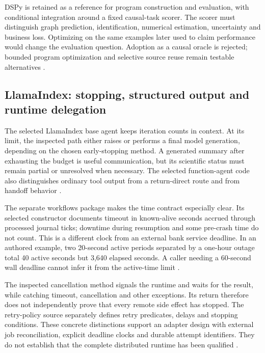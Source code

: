 DSPy is retained as a reference for program construction and evaluation,
with conditional integration around a fixed causal-task scorer. The
scorer must distinguish graph prediction, identification, numerical
estimation, uncertainty and business loss. Optimizing on the same examples
later used to claim performance would change the evaluation question.
Adoption as a causal oracle is rejected; bounded program optimization and
selective source reuse remain testable alternatives
\citep{exec24_framework_contracts}.

\subsection{LlamaIndex: stopping, structured output and runtime delegation}
The selected LlamaIndex base agent keeps iteration counts in context.
At its limit, the inspected path either raises or performs a final model
generation, depending on the chosen early-stopping method. A generated
summary after exhausting the budget is useful communication, but its
scientific status must remain partial or unresolved when necessary.
The selected function-agent code also distinguishes ordinary tool output
from a return-direct route and from handoff behavior
\citep{exec24_framework_llama_index}.

The separate workflows package makes the time contract especially clear.
Its selected constructor documents timeout in known-alive seconds accrued
through processed journal ticks; downtime during resumption and some
pre-crash time do not count. This is a different clock from an external
bank service deadline. In an authored example, two 20-second active
periods separated by a one-hour outage total 40 active seconds but
3,640 elapsed seconds. A caller needing a 60-second wall deadline cannot
infer it from the active-time limit
\citep{exec24_framework_workflows,exec24_framework_contracts}.

The inspected cancellation method signals the runtime and waits for the
result, while catching timeout, cancellation and other exceptions. Its
return therefore does not independently prove that every remote side
effect has stopped. The retry-policy source separately defines retry
predicates, delays and stopping conditions. These concrete distinctions
support an adapter design with external job reconciliation, explicit
deadline clocks and durable attempt identifiers. They do not establish
that the complete distributed runtime has been qualified
\citep{exec24_framework_workflows,exec24_framework_contracts}.

